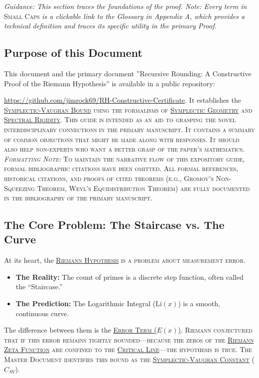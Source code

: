 \documentclass[sn-mathphys-num, pdflatex, referee]{sn-jnl}
\newcommand{\gterm}[2]{\begingroup\normalfont\scshape\hyperlink{#1}{#2}\endgroup}
\begin{document}
\textit{Guidance: This section traces the foundations of the proof. Note: Every term in} \textsc{Small Caps} \textit{is a clickable link to the Glossary in Appendix A, which provides a technical definition and traces its specific utility in the primary Proof.}
\subsection{Purpose of this Document}
This document and the primary document ''Recursive Rounding: A Constructive Proof of the Riemann Hypothesis'' is available in a public repository:  

\noindent \url{https://github.com/jimrock69/RH-Constructive-Certificate}. It establishes the \gterm{sv_bound}{Symplectic-Vaughan Bound} using the formalisms of \gterm{geometry}{Symplectic Geometry} and \gterm{spectral}{Spectral Rigidity}. This guide is intended as an aid to grasping the novel interdisciplinary connections in the primary manuscript. It contains a summary of common objections that might be made along with responses. It should also help non-experts who want a better grasp of the paper's mathematics.  \textit{Formatting Note:} To maintain the narrative flow of this expository guide, formal bibliographic citations have been omitted. All formal references, historical citations, and proofs of cited theorems (e.g., Gromov's Non-Squeezing Theorem, Weyl's Equidistribution Theorem) are fully documented in the bibliography of the primary manuscript.

\subsection{The Core Problem: The Staircase vs. The Curve}
At its heart, the \gterm{rh}{Riemann Hypothesis} is a problem about measurement error.
\begin{itemize}
    \item \textbf{The Reality:} The count of primes is a discrete step function, often called the ``Staircase.''
    \item \textbf{The Prediction:} The Logarithmic Integral ($\text{Li}(x)$) is a smooth, continuous curve.
\end{itemize}
The difference between them is the \gterm{error_term}{Error Term ($E(x)$)}. Riemann conjectured that if this error remains tightly bounded---because the zeros of the \gterm{zeta}{Riemann Zeta Function} are confined to the \gterm{critical_line}{Critical Line}---the hypothesis is true.
The Master Document identifies this bound as the \gterm{csv}{Symplectic-Vaughan Constant} ($C_{SV}$).
\end{document}
